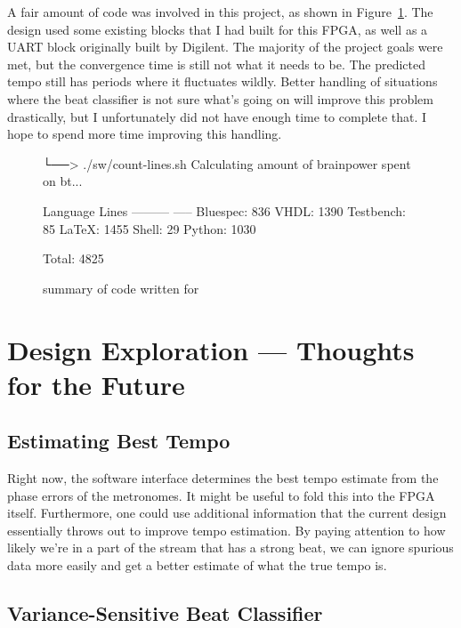 \documentclass[letterpaper]{article}
\begin{document}
    A fair amount of code was involved in this project, as shown in
    Figure~\ref{fig:linecount}.  The design used some existing blocks that I
    had built for this FPGA, as well as a UART block originally built by
    Digilent.  The majority of the project goals were met, but the convergence
    time is still not what it needs to be.  The predicted tempo still has
    periods where it fluctuates wildly.  Better handling of situations where
    the beat classifier is not sure what's going on will improve this problem
    drastically, but I unfortunately did not have enough time to complete that.
    I hope to spend more time improving this handling.

    \begin{figure}
        \centering
\begin{monospace}
└──> ./sw/count-lines.sh 
Calculating amount of brainpower spent on bt...

Language   Lines
---------  -----
 Bluespec:   836
     VHDL:  1390
Testbench:    85
    LaTeX:  1455
    Shell:    29
   Python:  1030

    Total:  4825
\end{monospace}
        \caption{summary of code written for \projname}
        \label{fig:linecount}
    \end{figure}

\section{Design Exploration --- Thoughts for the Future}
    \subsection{Estimating Best Tempo}
        Right now, the software interface determines the best tempo estimate
        from the phase errors of the metronomes.  It might be useful to fold
        this into the FPGA itself.  Furthermore, one could use additional
        information that the current design essentially throws out to improve
        tempo estimation.  By paying attention to how likely we're in a part of
        the stream that has a strong beat, we can ignore spurious data more
        easily and get a better estimate of what the true tempo is.

    \subsection{Variance-Sensitive Beat Classifier}
        
\end{document}
